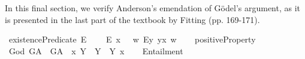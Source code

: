 %
\begin{isabellebody}%
%
%
\isadelimtheory
%
\endisadelimtheory
%
\isatagtheory
%
\endisatagtheory
{\isafoldtheory}%
%
\isadelimtheory
%
\endisadelimtheory
%
\isamarkuptrue%
%
\begin{isamarkuptext}%
In this final section, we verify Anderson's emendation of G\"odel's argument, as it is presented in the last
part of the textbook by Fitting (pp. 169-171).%
\end{isamarkuptext}\isamarkuptrue%
%
\isamarkuptrue%
\isamarkupfalse%
\ existencePredicate{\isacharcolon}{\isacharcolon}{\isachardoublequoteopen}{\isasymup}{\isasymlangle}{\isasymzero}{\isasymrangle}{\isachardoublequoteclose}\ {\isacharparenleft}{\isachardoublequoteopen}E{\isacharbang}{\isachardoublequoteclose}{\isacharparenright}\ \isanewline
\ \ \ {\isachardoublequoteopen}E{\isacharbang}\ x\ \ {\isasymequiv}\ {\isasymlambda}w{\isachardot}\ {\isacharparenleft}\isactrlbold {\isasymexists}\isactrlsup Ey{\isachardot}\ y\isactrlbold {\isasymapprox}x{\isacharparenright}\ w{\isachardoublequoteclose}\isanewline
\ \ \isanewline
{}\isamarkupfalse%
\ positiveProperty{\isacharcolon}{\isacharcolon}{\isachardoublequoteopen}{\isasymup}{\isasymlangle}{\isasymup}{\isasymlangle}{\isasymzero}{\isasymrangle}{\isasymrangle}{\isachardoublequoteclose}\ {\isacharparenleft}{\isachardoublequoteopen}{\isasymP}{\isachardoublequoteclose}{\isacharparenright}\isanewline
\ \ \isanewline
{}\isamarkupfalse%
\ God{\isacharcolon}{\isacharcolon}{\isachardoublequoteopen}{\isasymup}{\isasymlangle}{\isasymzero}{\isasymrangle}{\isachardoublequoteclose}\ {\isacharparenleft}{\isachardoublequoteopen}G\isactrlsup A{\isachardoublequoteclose}{\isacharparenright}\ \ {\isachardoublequoteopen}G\isactrlsup A\ {\isasymequiv}\ {\isasymlambda}x{\isachardot}\ \isactrlbold {\isasymforall}Y{\isachardot}\ {\isacharparenleft}{\isasymP}\ Y{\isacharparenright}\ \isactrlbold {\isasymleftrightarrow}\ \isactrlbold {\isasymbox}{\isacharparenleft}Y\ x{\isacharparenright}{\isachardoublequoteclose}\isanewline
\ \ \isanewline
{}\isamarkupfalse%
\ Entailment{\isacharcolon}{\isacharcolon}{\isachardoublequoteopen}{\isasymup}{\isasymlangle}{\isasymup}{\isasymlangle}{\isasymzero}{\isasymrangle}{\isacharcomma}{\isasymup}{\isasymlangle}{\isasymzero}{\isasymrangle}{\isasymrangle}{\isachardoublequoteclose}\ {\isacharparenleft}\ {\isachardoublequoteopen}{\isasymRrightarrow}{\isachardoublequoteclose}\ {}{}{\isacharparenright}\ \isanewline

\end{isabellebody}
